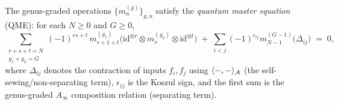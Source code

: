 \begin{theorem}\label{thm:quantum-master-equation}
The genus-graded operations $\{m_n^{(g)}\}_{g,n}$ satisfy the
\emph{quantum master equation} (QME): for each $N \geq 0$ and
$G \geq 0$,
\begin{equation}\label{eq:QME}
\sum_{\substack{r + s + t = N \\ g_1 + g_2 = G}}
(-1)^{rs+t}\,
m_{r+1+t}^{(g_1)}\!\bigl(\mathrm{id}^{\otimes r}
\otimes m_s^{(g_2)} \otimes \mathrm{id}^{\otimes t}\bigr)
\;+\;
\sum_{i < j}
(-1)^{\epsilon_{ij}}
m_{N-1}^{(G-1)}\bigl(\Delta_{ij}\bigr)
\;=\; 0,
\end{equation}
where $\Delta_{ij}$ denotes the contraction of inputs $f_i, f_j$
using $\langle -, - \rangle_{\mathcal{A}}$ (the self-sewing/non-separating
term), $\epsilon_{ij}$ is the Koszul sign, and the first sum is
the genus-graded $A_\infty$ composition relation (separating term).
\end{theorem}

